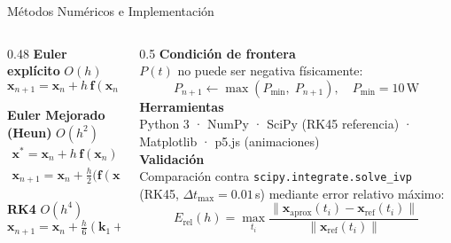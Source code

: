 \documentclass[aspectratio=169, 10pt]{beamer}
\begin{document}
\begin{frame}{Métodos Numéricos e Implementación}
  \begin{columns}[t]
    \begin{column}{0.48\textwidth}
      \textcolor{accent}{\small\textbf{Euler explícito}} \textcolor{muted}{\scriptsize $O(h)$}
      \begin{equation*}
        \mathbf{x}_{n+1} = \mathbf{x}_n + h\,\mathbf{f}(\mathbf{x}_n)
      \end{equation*}

      \textcolor{accent}{\small\textbf{Euler Mejorado (Heun)}} \textcolor{muted}{\scriptsize $O(h^2)$}
      \begin{gather*}
        \mathbf{x}^* = \mathbf{x}_n + h\,\mathbf{f}(\mathbf{x}_n)\\
        \mathbf{x}_{n+1} = \mathbf{x}_n + \tfrac{h}{2}
          \bigl(\mathbf{f}(\mathbf{x}_n)+\mathbf{f}(\mathbf{x}^*)\bigr)
      \end{gather*}

      \textcolor{accent}{\small\textbf{RK4}} \textcolor{muted}{\scriptsize $O(h^4)$}
      \begin{equation*}
        \mathbf{x}_{n+1} = \mathbf{x}_n
          + \tfrac{h}{6}(\mathbf{k}_1 + 2\mathbf{k}_2 + 2\mathbf{k}_3 + \mathbf{k}_4)
      \end{equation*}
    \end{column}
    \begin{column}{0.5\textwidth}
      \textcolor{accent}{\small\textbf{Condición de frontera}}\\
      \scriptsize $P(t)$ no puede ser negativa físicamente:
      \begin{equation*}
        P_{n+1} \leftarrow \max(P_{\min},\; P_{n+1}),
        \quad P_{\min}=10\,\text{W}
      \end{equation*}
      \vspace{6pt}
      \textcolor{accent}{\small\textbf{Herramientas}}\\
      \scriptsize Python 3 · NumPy · SciPy (RK45 referencia) ·
      Matplotlib · p5.js (animaciones)\\[6pt]

      \textcolor{accent}{\small\textbf{Validación}}\\
      \scriptsize Comparación contra \texttt{scipy.integrate.solve\_ivp}
      (RK45, $\Delta t_{\max}=0.01$\,s) mediante error relativo máximo:
      \begin{equation*}
        E_{\text{rel}}(h) = \max_{t_i}
        \frac{\|\mathbf{x}_{\text{aprox}}(t_i) - \mathbf{x}_{\text{ref}}(t_i)\|}
             {\|\mathbf{x}_{\text{ref}}(t_i)\|}
      \end{equation*}
    \end{column}
  \end{columns}
\end{frame}
\end{document}
